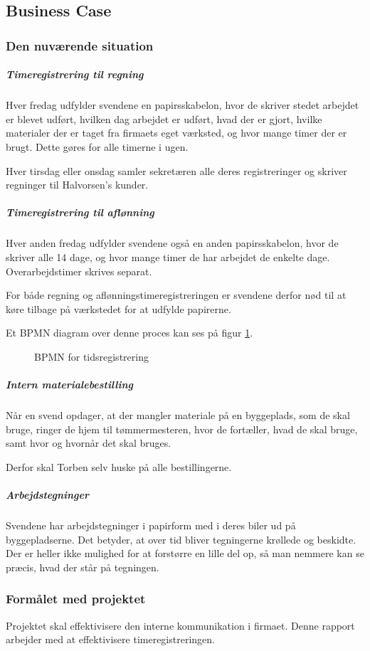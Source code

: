 \subsection{Business Case}
\subsubsection{Den nuværende situation}
\subparagraph{Timeregistrering til regning}

    Hver fredag udfylder svendene en papirsskabelon, hvor de skriver stedet arbejdet er blevet udført, hvilken dag arbejdet er udført, hvad der er gjort, hvilke materialer der er taget fra firmaets eget værksted, og hvor mange timer der er brugt.
    Dette gøres for alle timerne i ugen.
    
    Hver tirsdag eller onsdag samler sekretæren alle deres registreringer og skriver regninger til Halvorsen's kunder.

\subparagraph{Timeregistrering til aflønning}
    Hver anden fredag udfylder svendene også en anden papirsskabelon, hvor de skriver alle 14 dage, og hvor mange timer de har arbejdet de enkelte dage. Overarbejdstimer skrives separat.
    
    For både regning og aflønningstimeregistreringen er svendene derfor nød til at køre tilbage på værkstedet for at udfylde papirerne.

Et BPMN diagram over denne proces kan ses på figur \ref{fig:BPMN}.
    
\begin{figure}
    \caption{BPMN for tidsregistrering}
    \label{fig:BPMN}
\end{figure}
    
\subparagraph{Intern materialebestilling}
    Når en svend opdager, at der mangler materiale på en byggeplads, som de skal bruge, ringer de hjem til tømmermesteren, hvor de fortæller, hvad de skal bruge, samt hvor og hvornår det skal bruges.
    
    Derfor skal Torben selv huske på alle bestillingerne.
    
\subparagraph{Arbejdstegninger}
    Svendene har arbejdstegninger i papirform med i deres biler ud på byggepladserne.
    Det betyder, at over tid bliver tegningerne krøllede og beskidte.
    Der er heller ikke mulighed for at forstørre en lille del op, så man nemmere kan se præcis, hvad der står på tegningen.
    
\subsubsection{Formålet med projektet}
    Projektet skal effektivisere den interne kommunikation i     firmaet.
    Denne rapport arbejder med at effektivisere timeregistreringen.
    
